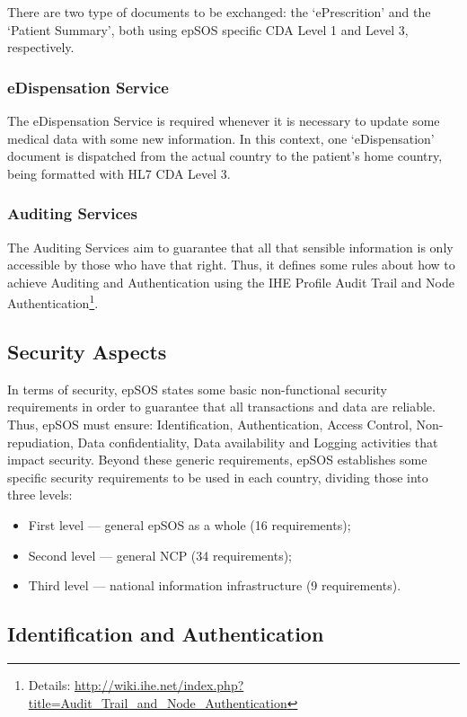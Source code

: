 There are two type of documents to be exchanged: the `ePrescrition' and the `Patient Summary', both using epSOS specific CDA Level 1 and Level 3, respectively.

\subsubsection{eDispensation Service}

The eDispensation Service is required whenever it is necessary to update some medical data with some new information. In this context, one `eDispensation' document is dispatched from the actual country to the patient's home country, being formatted with HL7 CDA Level 3.

\subsubsection{Auditing Services}

The Auditing Services aim to guarantee that all that sensible information is only accessible by those who have that right. Thus, it defines some rules about how to achieve Auditing and Authentication using the IHE Profile Audit Trail and Node Authentication\footnote{Details: \url{http://wiki.ihe.net/index.php?title=Audit_Trail_and_Node_Authentication}}. 

\subsection{Security Aspects}
In terms of security, epSOS states some basic non-functional security requirements in order to guarantee that all transactions and data are reliable. Thus, epSOS must ensure: Identification, Authentication, Access Control, Non-repudiation, Data confidentiality, Data availability and Logging activities that impact security. Beyond these generic requirements, epSOS establishes some specific security requirements to be used in each country, dividing those into three levels:
\begin{itemize}
\item First level --- general epSOS as a whole (16 requirements);
\item Second level --- general NCP (34 requirements);
\item Third level --- national information infrastructure (9 requirements).
\end{itemize}

\subsection{Identification and Authentication}

